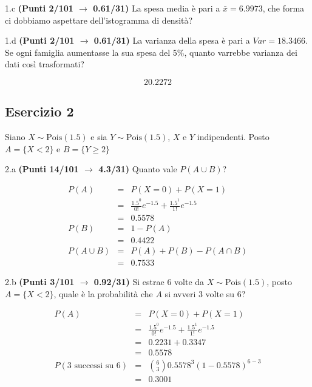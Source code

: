 \documentclass[
  11pt,
]{book}
\theoremstyle{mytheoremstyle}
\theoremstyle{mydefstyle}
\newenvironment{sol}
  {
  \begin{tcolorbox}[enhanced,breakable,arc=0.1mm,boxrule=1pt,colback=white,colframe=iblue,
  title=\bf \fontfamily{lmss}\selectfont \hspace{.5 cm} Soluzione,drop fuzzy shadow]

}{
\end{tcolorbox}
  }
\begin{document}
1.c \textbf{(Punti 2/101 \(\rightarrow\) 0.61/31)} La spesa media è pari a \(\bar x=6.9973\), che forma ci dobbiamo aspettare dell'istogramma di densità?

1.d \textbf{(Punti 2/101 \(\rightarrow\) 0.61/31)} La varianza della spesa è pari a \(Var=18.3466\).
Se ogni famiglia aumentasse la sua spesa del 5\%, quanto varrebbe varianza dei dati così trasformati?

\begin{sol}
\[20.2272\]

\end{sol}

\subsection{Esercizio 2}\label{esercizio-2-11}

Siano \(X\sim \text{Pois}(1.5)\) e sia \(Y\sim \text{Pois}(1.5)\), \(X\) e \(Y\) indipendenti. Posto \(A=\{X<2\}\) e \(B=\{Y\ge 2\}\)

2.a \textbf{(Punti 14/101 \(\rightarrow\) 4.3/31)} Quanto vale \(P(A\cup B)\)?

\begin{sol}
\begin{eqnarray*}
  P(A) &=&  P(X=0)+P(X=1)\\
  &=& \frac{1.5^0}{0!}e^{-1.5}+\frac{1.5^1}{1!}e^{-1.5}\\
  &=& 0.5578\\
  P(B) &=& 1-P(A)\\
  &=&0.4422\\
  P(A\cup B) &=& P(A)+P(B)-P(A\cap B)\\
  &=& 0.7533
\end{eqnarray*}

\end{sol}

2.b \textbf{(Punti 3/101 \(\rightarrow\) 0.92/31)} Si estrae 6 volte da \(X\sim \text{Pois}(1.5)\), posto \(A=\{X<2\}\), quale è la probabilità che \(A\) si avveri 3 volte su 6?

\begin{sol}
\begin{eqnarray*}
  P(A) &=&  P(X=0)+P(X=1)\\
  &=& \frac{1.5^0}{0!}e^{-1.5}+\frac{1.5^1}{1!}e^{-1.5}\\
  &=& 0.2231+0.3347\\
  &=& 0.5578\\
  P(\text{3 successi su 6}) &=& \binom{6}{3}0.5578^3(1-0.5578)^{6-3}\\
  &=&0.3001
\end{eqnarray*}

\end{sol}
\end{document}
